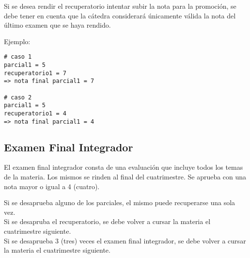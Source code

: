 \documentclass[
  letterpaper,
  DIV=11,
  numbers=noendperiod]{scrreprt}
\begin{document}
\begin{tcolorbox}[enhanced jigsaw, opacityback=0, coltitle=black, toptitle=1mm, colframe=quarto-callout-tip-color-frame, leftrule=.75mm, colback=white, opacitybacktitle=0.6, toprule=.15mm, breakable, bottomrule=.15mm, rightrule=.15mm, bottomtitle=1mm, titlerule=0mm, title=\textcolor{quarto-callout-tip-color}{\faLightbulb}\hspace{0.5em}{Rendir Recuperatorios para Promoción}, colbacktitle=quarto-callout-tip-color!10!white, left=2mm, arc=.35mm]

Si se desea rendir el recuperatorio intentar subir la nota para la
promoción, se debe tener en cuenta que la cátedra considerará únicamente
válida la nota del último examen que se haya rendido.

Ejemplo:

\begin{verbatim}
# caso 1
parcial1 = 5
recuperatorio1 = 7
=> nota final parcial1 = 7

# caso 2
parcial1 = 5
recuperatorio1 = 4
=> nota final parcial1 = 4
\end{verbatim}

\end{tcolorbox}

\subsection*{Examen Final Integrador}\label{examen-final-integrador}

El examen final integrador consta de una evaluación que incluye todos
los temas de la materia. Los mismos se rinden al final del cuatrimestre.
Se aprueba con una nota mayor o igual a 4 (cuatro).

\begin{tcolorbox}[enhanced jigsaw, opacityback=0, coltitle=black, toptitle=1mm, colframe=quarto-callout-warning-color-frame, leftrule=.75mm, colback=white, opacitybacktitle=0.6, toprule=.15mm, breakable, bottomrule=.15mm, rightrule=.15mm, bottomtitle=1mm, titlerule=0mm, title=\textcolor{quarto-callout-warning-color}{\faExclamationTriangle}\hspace{0.5em}{Desaprobación de la Materia}, colbacktitle=quarto-callout-warning-color!10!white, left=2mm, arc=.35mm]

Si se desaprueba alguno de los parciales, el mismo puede recuperarse una
sola vez.\\
Si se desapruba el recuperatorio, se debe volver a cursar la materia el
cuatrimestre siguiente.\\
Si se desaprueba 3 (tres) veces el examen final integrador, se debe
volver a cursar la materia el cuatrimestre siguiente.

\end{tcolorbox}
\end{document}
